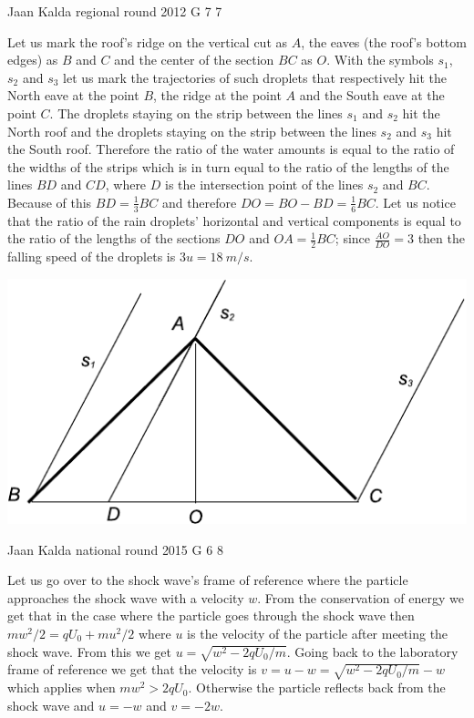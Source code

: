 \documentclass[11pt]{article}
\begin{document}
{Jaan Kalda} %
{regional round} %
{2012} %
{G 7} %
{7} %
{

\ifEngSolution
Let us mark the roof's ridge on the vertical cut as $A$, the eaves (the roof's bottom edges) as $B$ and $C$ and the center of the section $BC$ as $O$. With the symbols $s_1$, $s_2$ and $s_3$ let us mark the trajectories of such droplets that respectively hit the North eave at the point $B$, the ridge at the point $A$ and the South eave at the point $C$. The droplets staying on the strip between the lines $s_1$ and $s_2$ hit the North roof and the droplets staying on the strip between the lines $s_2$ and $s_3$ hit the South roof. Therefore the ratio of the water amounts is equal to the ratio of the widths of the strips which is in turn equal to the ratio of the lengths of the lines $BD$ and $CD$, where $D$ is the intersection point of the lines $s_2$ and $BC$. Because of this $BD=\frac 13 BC$ and therefore $DO=BO-BD=\frac 16 BC$. Let us notice that the ratio of the rain droplets' horizontal and vertical components is equal to the ratio of the lengths of the sections $DO$ and $OA=\frac 12 BC$; since $\frac {AO}{DO}=3$ then the falling speed of the droplets is $3u=\SI{18}{m/s}$.
\begin{center}
\includegraphics[width=0.5\linewidth]{2012-v2g-07-katus}
\end{center}
\fi
}

{Jaan Kalda} %
{national round} %
{2015} %
{G 6} %
{8} %
{

\ifEngSolution
Let us go over to the shock wave's frame of reference where the particle approaches the shock wave with a velocity $w$. From the conservation of energy we get that in the case where the particle goes through the shock wave then $mw^2/2=qU_0+mu^2/2$ where $u$ is the velocity of the particle after meeting the shock wave. From this we get $u=\sqrt{w^2-2qU_0/m}$. Going back to the laboratory frame of reference we get that the velocity is $v=u-w=\sqrt{w^2-2qU_0/m}-w$ which applies when $mw^2>2qU_0$. Otherwise the particle reflects back from the shock wave and $u=-w$ and $v=-2w$.
\fi
}
\end{document}
